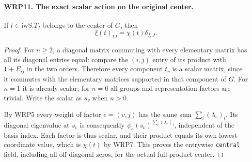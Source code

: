 \paragraph{WRP11. The exact scalar action on the original center.}
\label{claim:WRP11}
If $t\in\mathrm{iwS}.T_f$ belongs to the center of $G$,
then
\[
                 \xi(t)_{IJ}=\chi(t)\delta_{I,J}.
\]
\begin{proof}
For $n\geq2$, a diagonal matrix commuting with every
elementary matrix has all its diagonal entries equal:
compare the $(i,j)$ entry of its product with
$1+E_{ij}$ in the two orders.  Therefore every component
$t_v$ is a scalar matrix, since it commutes with the
elementary matrices supported in that component of $G$.
For $n=1$ it is already scalar; for $n=0$ all groups
and representation factors are trivial.  Write the
scalar as $s_v$ when $n>0$.

By WRP5 every weight of factor $e=(v,j)$ has the same
sum $\sum_i(\lambda_e)_i$.  Its diagonal eigenvalue
at $s_v$ is consequently
$\psi_e(s_v)^{\sum_i(\lambda_e)_i}$, independent of
the basis index.  Each factor is thus scalar, and
their product equals its own lowest-coordinate value,
which is $\chi(t)$ by WRP7.  This proves the entrywise
\texttt{central} field, including all off-diagonal
zeros, for the actual full product center.
\end{proof}

